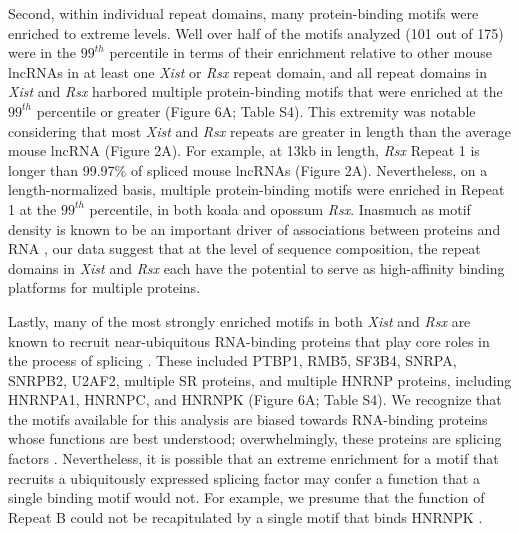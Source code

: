 Second, within individual repeat domains, many protein-binding motifs were enriched to extreme levels. Well over half of the motifs analyzed (101 out of 175) were in the $99^{th}$ percentile in terms of their enrichment relative to other mouse lncRNAs in at least one \emph{Xist} or \emph{Rsx} repeat domain, and all repeat domains in \emph{Xist} and \emph{Rsx} harbored multiple protein-binding motifs that were enriched at the $99^{th}$ percentile or greater (Figure 6A; Table S4). This extremity was notable considering that most \emph{Xist} and \emph{Rsx} repeats are greater in length than the average mouse lncRNA (Figure 2A). For example, at 13kb in length, \emph{Rsx} Repeat 1 is longer than 99.97\% of spliced mouse lncRNAs (Figure 2A). Nevertheless, on a length-normalized basis, multiple protein-binding motifs were enriched in Repeat 1 at the $99^{th}$ percentile, in both koala and opossum \emph{Rsx}. Inasmuch as motif density is known to be an important driver of associations between proteins and RNA \cite{Dominguez2018SequenceProteins,Kirk2018FunctionalContent,VanNostrand2016RobusteCLIP}, our data suggest that at the level of sequence composition, the repeat domains in \emph{Xist} and \emph{Rsx} each have the potential to serve as high-affinity binding platforms for multiple proteins.

Lastly, many of the most strongly enriched motifs in both \emph{Xist} and \emph{Rsx} are known to recruit near-ubiquitous RNA-binding proteins that play core roles in the process of splicing \cite{Wahl2015Snapshot:I}. These included PTBP1, RMB5, SF3B4, SNRPA, SNRPB2, U2AF2, multiple SR proteins, and multiple HNRNP proteins, including HNRNPA1, HNRNPC, and HNRNPK (Figure 6A; Table S4). We recognize that the motifs available for this analysis are biased towards RNA-binding proteins whose functions are best understood; overwhelmingly, these proteins are splicing factors \cite{Dominguez2018SequenceProteins,Ray2013ARegulation}. Nevertheless, it is possible that an extreme enrichment for a motif that recruits a ubiquitously expressed splicing factor may confer a function that a single binding motif would not. For example, we presume that the function of Repeat B could not be recapitulated by a single motif that binds HNRNPK \cite{Pintacuda2017HnRNPKSilencing}. 


